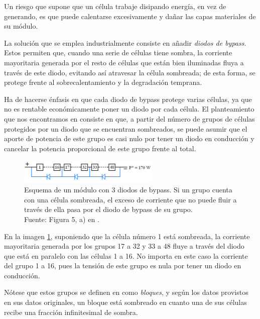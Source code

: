 Un riesgo que supone que un célula trabaje disipando energía, en vez de generando, es que puede calentarse excesivamente y dañar las capas materiales de su módulo.

La solución que se emplea industrialmente consiste en añadir \textit{diodos de bypass}. Estos permiten que, cuando una serie de células tiene sombra, la corriente mayoritaria generada por el resto de células que están bien iluminadas fluya a través de este diodo, evitando así atravesar la célula sombreada; de esta forma, se protege frente al sobrecalentamiento y la degradación temprana.

Ha de hacerse énfasis en que cada diodo de bypass protege varias células, ya que no es rentable económicamente poner un diodo por cada célula. El planteamiento que nos encontramos en \cite{Martínez-Moreno_Muñoz_Lorenzo_2010} consiste en que, a partir del número de grupos de células protegidos por un diodo que se encuentran sombreados, se puede asumir que el aporte de potencia de este grupo es casi nulo por tener un diodo en conducción y cancelar la potencia proporcional de este grupo frente al total.

\begin{figure}[H]
    \centering
    \includegraphics[width=0.6\textwidth]{./images/bypass_diodes/bypass_diodes.png}
    \caption{Esquema de un módulo con 3 diodos de bypass. Si un grupo cuenta con una célula sombreada, el exceso de corriente que no puede fluir a través de ella pasa por el diodo de bypass de su grupo.\\Fuente: Figura 5, a) en \cite{Martínez-Moreno_Muñoz_Lorenzo_2010}.}
    \label{fig:diodos_bypass}
\end{figure}

En la imagen \ref{fig:diodos_bypass}, suponiendo que la célula número 1 está sombreada, la corriente mayoritaria generada por los grupos 17 a 32 y 33 a 48 fluye a través del diodo que está en paralelo con las células 1 a 16. No importa en este caso la corriente del grupo 1 a 16, pues la tensión de este grupo es nula por tener un diodo en conducción.

Nótese que estos grupos se definen en \cite{Martínez-Moreno_Muñoz_Lorenzo_2010} como \textit{bloques}, y según los datos provistos en sus datos originales, un bloque está sombreado en cuanto una de sus células recibe una fracción infinitesimal de sombra.

